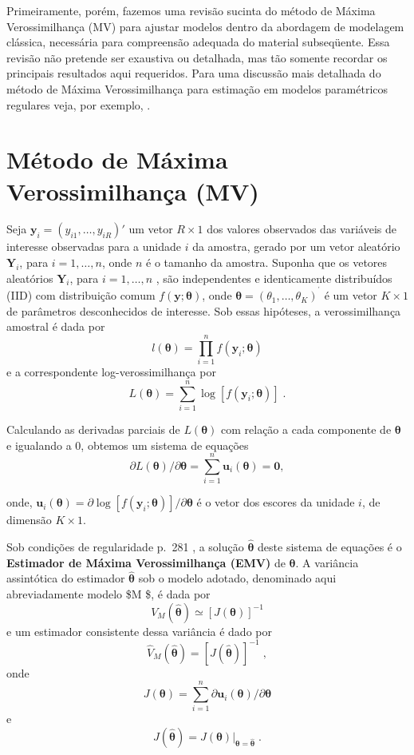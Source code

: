 \documentclass[]{book}
\numberwithin{example}{chapter}
\numberwithin{remark}{chapter}
\numberwithin{definition}{chapter}
\begin{document}
Primeiramente, porém, fazemos uma revisão sucinta do método de Máxima
Verossimilhança (MV) para ajustar modelos dentro da abordagem de
modelagem clássica, necessária para compreensão adequada do material
subseqüente. Essa revisão não pretende ser exaustiva ou detalhada, mas
tão somente recordar os principais resultados aqui requeridos. Para uma
discussão mais detalhada do método de Máxima Verossimilhança para
estimação em modelos paramétricos regulares veja, por exemplo,
\citep{garthwaite}.

\section{Método de Máxima Verossimilhança
(MV)}\label{metodo-de-maxima-verossimilhanca-mv}

Seja \(\mathbf{y}_{i}=\left(y_{i1},\ldots,y_{iR}\right)'\) um vetor
\(R\times 1\) dos valores observados das variáveis de interesse
observadas para a unidade \(i\) da amostra, gerado por um vetor
aleatório \(\mathbf{Y}_{i}\), para \(i=1,\ldots ,n\), onde \(n\) é o
tamanho da amostra. Suponha que os vetores aleatórios
\(\mathbf{Y}_{i}\), para \(i=1,\ldots ,n\) , são independentes e
identicamente distribuídos (IID) com distribuição comum
\(f(\mathbf{y};\mathbf{\theta })\), onde
\(\mathbf{\theta}=\left( \theta _{1},\ldots ,\theta _{K}\right) ^{^{\prime }}\)
é um vetor \(K\times 1\) de parâmetros desconhecidos de interesse. Sob
essas hipóteses, a verossimilhança amostral é dada por \[
l\left( \mathbf{\theta }\right) =\prod\limits_{i=1}^{n}f\left( \mathbf{y}
_{i};\mathbf{\theta }\right) 
\] e a correspondente log-verossimilhança por \[
L\left( \mathbf{\theta }\right) =\sum_{i=1}^n\log \left[
f\left( \mathbf{y}_{i};\mathbf{\theta }\right) \right] \;. 
\]

Calculando as derivadas parciais de \(L\left(\mathbf{\theta}\right)\)
com relação a cada componente de \(\mathbf{\theta }\) e igualando a
\(0\), obtemos um sistema de equações \[
\partial L\left( \mathbf{\theta }\right) /\partial \mathbf{\theta }=
\sum_{i=1}^n\mathbf{u}_{i}\left( \mathbf{\theta }\right) =\mathbf{0}, 
\]

onde,
\(\mathbf{u}_{i}\left(\mathbf{\theta }\right) =\partial\log\left[f\left(\mathbf{y}_{i};\mathbf{\theta}\right) \right] /\partial \mathbf{\theta }\)
é o vetor dos escores da unidade \(i\), de dimensão \(K\times1\).

Sob condições de regularidade p.~281 \citep{cox}, a solução
\(\mathbf{\hat{\theta}}\) deste sistema de equações é o
\textbf{Estimador de Máxima Verossimilhança (EMV)} de
\(\mathbf{\theta}\). A variância assintótica do estimador
\(\mathbf{\hat{\theta}}\) sob o modelo adotado, denominado aqui
abreviadamente modelo \$M \$, é dada por \[
V_{M}\left( \mathbf{\hat{\theta}}\right) \simeq \left[ J\left( \mathbf{
\theta }\right) \right] ^{-1} 
\] e um estimador consistente dessa variância é dado por \[
\hat{V}_{M}\left( \mathbf{\hat{\theta}}\right) =\left[ J\left( \mathbf{\hat{
\theta}}\right) \right] ^{-1}\;, 
\] onde \[
J\left( \mathbf{\theta }\right) =\sum\limits_{i=1}^{n}\partial \mathbf{u}
_{i}\left( \mathbf{\theta }\right) /\partial \mathbf{\theta } 
\] e \[
J\left( \mathbf{\hat{\theta}}\right) =\left. J\left( \mathbf{\theta }\right)
\right| _{\mathbf{\theta =\hat{\theta}}}\;. 
\]
\end{document}
